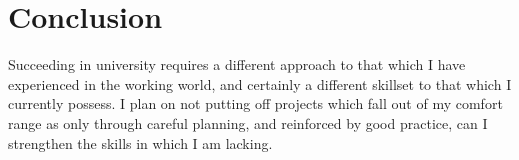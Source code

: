 \documentclass{scrartcl}
\begin{document}
\section{Conclusion}

Succeeding in university requires a different approach to that which I have experienced in the working world, and certainly a different skillset to that which I currently possess. I plan on not putting off projects which fall out of my comfort range as only through careful planning, and reinforced by good practice, can I strengthen the skills in which I am lacking. 



\end{document}
